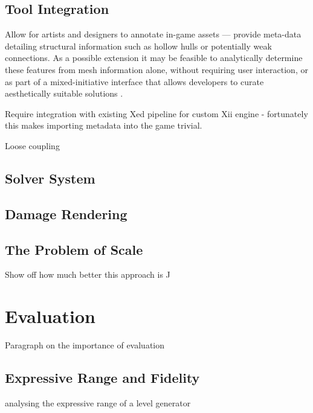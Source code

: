 \documentclass[11pt]{report}
\begin{document}
	\section{Tool Integration}
		Allow for artists and designers to annotate in-game assets --- provide meta-data detailing structural information such as hollow hulls or potentially weak connections. As a possible extension it may be feasible to analytically determine these features from mesh information alone, without requiring user interaction, or as part of a mixed-initiative interface that allows developers to curate aesthetically suitable solutions \cite{yannakakis2014mixed}.

		Require integration with existing Xed pipeline for custom Xii engine - fortunately this makes importing metadata into the game trivial.

		Loose coupling \cite{lee2013decoupling}
	\section{Solver System}

	\section{Damage Rendering}

	\section{The Problem of Scale}
		Show off how much better this approach is ^^

\chapter{Evaluation}
	Paragraph on the importance of evaluation

	\section{Expressive Range and Fidelity}
		\cite{smith2010analyzing} analysing the expressive range of a level generator
\end{document}
